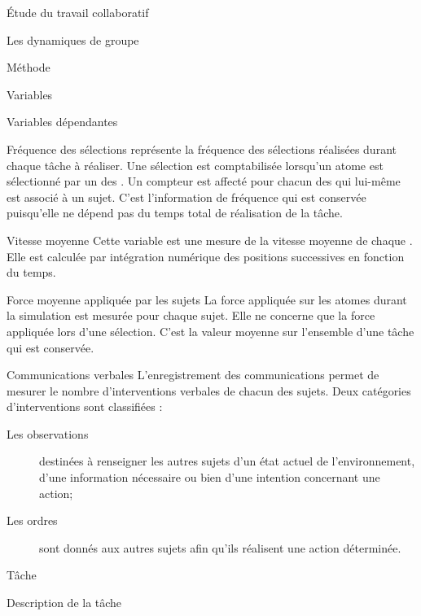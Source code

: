 \documentclass[myfrancais]{mythesis}
\begin{document}
\begin{mypart}{Étude du travail collaboratif}
\begin{mychapter}{Les dynamiques de groupe}
\begin{mysection}{Méthode}
\begin{mysubsection}{Variables}
\begin{mysubsubsection}{Variables dépendantes}
						\begin{myparagraph}{ Fréquence des sélections}
							 représente la fréquence des sélections réalisées durant chaque tâche à réaliser.
							Une sélection est comptabilisée lorsqu'un atome est sélectionné par un des .
							Un compteur est affecté pour chacun des  qui lui-même est associé à un sujet.
							C'est l'information de fréquence qui est conservée puisqu'elle ne dépend pas du temps total de réalisation de la tâche.
						\end{myparagraph}
						\begin{myparagraph}{ Vitesse moyenne}
							Cette variable est une mesure de la vitesse moyenne de chaque .
							Elle est calculée par intégration numérique des positions successives en fonction du temps.
						\end{myparagraph}
						\begin{myparagraph}{ Force moyenne appliquée par les sujets}
							La force appliquée sur les atomes durant la simulation est mesurée pour chaque sujet.
							Elle ne concerne que la force appliquée lors d'une sélection.
							C'est la valeur moyenne sur l'ensemble d'une tâche qui est conservée.
						\end{myparagraph}
						\begin{myparagraph}{ Communications verbales}
							L'enregistrement des communications permet de mesurer le nombre d'interventions verbales de chacun des sujets.
							Deux catégories d'interventions sont classifiées :
							\begin{description}
								\item[Les observations] destinées à renseigner les autres sujets d'un état actuel de l'environnement, d'une information nécessaire ou bien d'une intention concernant une action;
								\item[Les ordres] sont donnés aux autres sujets afin qu'ils réalisent une action déterminée.
							\end{description}
						\end{myparagraph}
					\end{mysubsubsection}
				\end{mysubsection}
				\begin{mysubsection}[sse-exp3-Tache]{Tâche}
					\begin{mysubsubsection}{Description de la tâche}

\end{mysubsubsection}
\end{mysubsection}
\end{mysection}
\end{mychapter}
\end{mypart}
\end{document}
